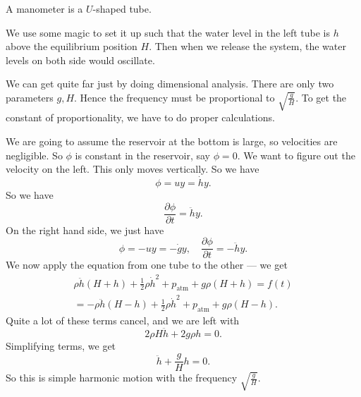 \documentclass[a4paper]{article}
\begin{document}
\begin{eg}
  A manometer is a $U$-shaped tube.
  \begin{center}
  \end{center}
  We use some magic to set it up such that the water level in the left tube is $h$ above the equilibrium position $H$. Then when we release the system, the water levels on both side would oscillate.

  We can get quite far just by doing dimensional analysis. There are only two parameters $g, H$. Hence the frequency must be proportional to $\sqrt{\frac{g}{H}}$. To get the constant of proportionality, we have to do proper calculations.

  We are going to assume the reservoir at the bottom is large, so velocities are negligible. So $\phi$ is constant in the reservoir, say $\phi = 0$. We want to figure out the velocity on the left. This only moves vertically. So we have
  \[
    \phi = uy = \dot{h}y.
  \]
  So we have
  \[
    \frac{\partial \phi}{\partial t} = \ddot{h}y.
  \]
  On the right hand side, we just have
  \[
    \phi = -uy = -\dot{g} y,\quad \frac{\partial \phi}{\partial t} = -\ddot{h}y.
  \]
  We now apply the equation from one tube to the other --- we get
  \begin{multline*}
    \rho \ddot{h} (H + h) + \frac{1}{2}\rho \dot{h}^2 + p_{\mathrm{atm}} + g\rho(H + h) = f(t) \\
    = -\rho\ddot{h}(H - h) + \frac{1}{2}\rho \dot{h}^2 + p_{\mathrm{atm}} + g\rho(H - h).
  \end{multline*}
  Quite a lot of these terms cancel, and we are left with
  \[
    2 \rho H\ddot{h} + 2g\rho h = 0.
  \]
  Simplifying terms, we get
  \[
    \ddot{h} + \frac{g}{H} h = 0.
  \]
  So this is simple harmonic motion with the frequency $\sqrt{\frac{g}{H}}$.
\end{eg}
\end{document}
